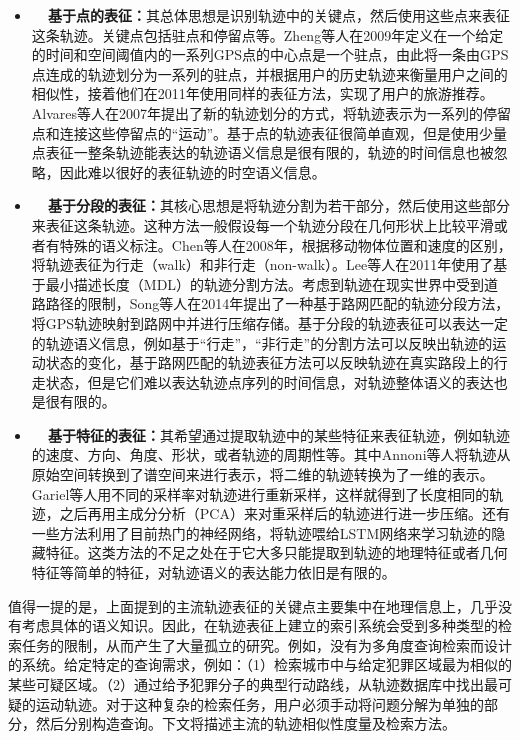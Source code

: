 \begin{itemize}
    \item \textbf{~~基于点的表征：}其总体思想是识别轨迹中的关键点，然后使用这些点来表征这条轨迹。关键点包括驻点和停留点等。Zheng等人在2009年定义在一个给定的时间和空间阈值内的一系列GPS点的中心点是一个驻点，由此将一条由GPS点连成的轨迹划分为一系列的驻点，并根据用户的历史轨迹来衡量用户之间的相似性，接着他们在2011年使用同样的表征方法，实现了用户的旅游推荐。Alvares等人在2007年提出了新的轨迹划分的方式，将轨迹表示为一系列的停留点和连接这些停留点的“运动”。基于点的轨迹表征很简单直观，但是使用少量点表征一整条轨迹能表达的轨迹语义信息是很有限的，轨迹的时间信息也被忽略，因此难以很好的表征轨迹的时空语义信息。

    \item \textbf{~~基于分段的表征：}其核心思想是将轨迹分割为若干部分，然后使用这些部分来表征这条轨迹。这种方法一般假设每一个轨迹分段在几何形状上比较平滑或者有特殊的语义标注。Chen等人在2008年，根据移动物体位置和速度的区别，将轨迹表征为行走（walk）和非行走（non-walk）。Lee等人在2011年使用了基于最小描述长度（MDL）的轨迹分割方法。考虑到轨迹在现实世界中受到道路路径的限制，Song等人在2014年提出了一种基于路网匹配的轨迹分段方法，将GPS轨迹映射到路网中并进行压缩存储。基于分段的轨迹表征可以表达一定的轨迹语义信息，例如基于“行走”，“非行走”的分割方法可以反映出轨迹的运动状态的变化，基于路网匹配的轨迹表征方法可以反映轨迹在真实路段上的行走状态，但是它们难以表达轨迹点序列的时间信息，对轨迹整体语义的表达也是很有限的。

    \item \textbf{~~基于特征的表征：}其希望通过提取轨迹中的某些特征来表征轨迹，例如轨迹的速度、方向、角度、形状，或者轨迹的周期性等。其中Annoni等人将轨迹从原始空间转换到了谱空间来进行表示，将二维的轨迹转换为了一维的表示。Gariel等人用不同的采样率对轨迹进行重新采样，这样就得到了长度相同的轨迹，之后再用主成分分析（PCA）来对重采样后的轨迹进行进一步压缩。还有一些方法利用了目前热门的神经网络，将轨迹喂给LSTM网络来学习轨迹的隐藏特征。这类方法的不足之处在于它大多只能提取到轨迹的地理特征或者几何特征等简单的特征，对轨迹语义的表达能力依旧是有限的。
\end{itemize}

值得一提的是，上面提到的主流轨迹表征的关键点主要集中在地理信息上，几乎没有考虑具体的语义知识。因此，在轨迹表征上建立的索引系统会受到多种类型的检索任务的限制，从而产生了大量孤立的研究。例如，没有为多角度查询检索而设计的系统。给定特定的查询需求，例如：（1）检索城市中与给定犯罪区域最为相似的某些可疑区域。（2）通过给予犯罪分子的典型行动路线，从轨迹数据库中找出最可疑的运动轨迹。对于这种复杂的检索任务，用户必须手动将问题分解为单独的部分，然后分别构造查询。下文将描述主流的轨迹相似性度量及检索方法。





